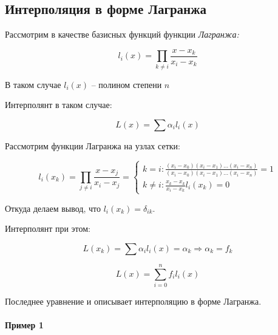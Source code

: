 \documentclass[10pt,a4paper]{article}
\begin{document}
	\subsection{Интерполяция в форме Лагранжа}
	
		Рассмотрим в качестве базисных функций функции \textit{Лагранжа:}
		
		\begin{equation}
			l_{i}\left(x\right)  = \prod \limits_{k \neq i} 
			\frac{x - x_{k}}{x_{i} - x_{k}}
		\end{equation}
		
		В таком случае $l_{i}\left(x\right)$ -- полином степени $n$
		
		Интерполянт в таком случае:
		
		\begin{equation}
			L\left(x\right) = \sum\alpha_{i}l_{i}\left(x\right)
		\end{equation}
		
		Рассмотрим функции Лагранжа на узлах сетки:
		
		\begin{equation}
			l_{i}\left(x_{k}\right) = \prod\limits_{j \neq i}
			\frac{x - x_{j}}{x_{i} - x_{j}} = 
			\begin{cases}
				k = i: \frac{\left(x_{i} - x_{0}\right)
				\left(x_{i} - x_{1}\right)\ldots \left(x_{i} - x_{n}\right)}
				{\left(x_{i} - x_{0}\right)
				\left(x_{i} - x_{1}\right)\ldots \left(x_{i} - x_{n}\right)}
				= 1
				\\
				k \neq i : \frac{x_{k} - x_{k}}{x_{i} - x_{k}}l_{i}\left(x_{k}
				\right) = 0			
			\end{cases}
		\end{equation}
		
		Откуда делаем вывод, что $l_{i}\left(x_{k}\right) = \delta_{ik}$.
		
		Интерполянт при этом:
		
		\begin{equation}
			L\left(x_{k}\right) = \sum \alpha_{i}l_{i}\left(x\right) = \alpha_{k}
			\Rightarrow \alpha_{k} = f_{k}
		\end{equation}
		
		\begin{equation}
			L\left(x\right) = \sum\limits_{i = 0}^{n}f_{i}l_{i}\left(x\right)
		\end{equation}
		
		Последнее уравнение и описывает интерполяцию в форме Лагранжа.
		
		\paragraph*{Пример 1}
		
\end{document}
